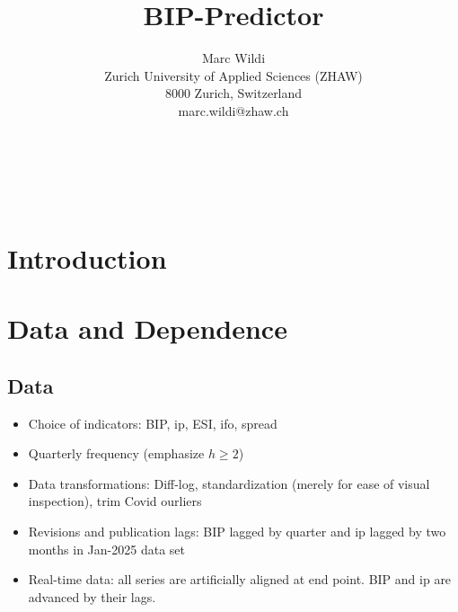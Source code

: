 \documentclass[a4paper]{article}
\title{BIP-Predictor}
\author{Marc Wildi\\
Zurich University of Applied Sciences (ZHAW)\\
8000 Zurich, Switzerland\\
marc.wildi@zhaw.ch}
\begin{document}
\maketitle

\begin{abstract}
\noindent 

\end{abstract}

~\\
~\\





\section{Introduction}



\section{Data and Dependence}




\subsection{Data}

\begin{itemize}
\item Choice of indicators: BIP, ip, ESI, ifo, spread
\item Quarterly frequency (emphasize $h\geq 2$)
\item Data transformations: Diff-log, standardization (merely for ease of visual inspection), trim Covid ourliers
\item Revisions and publication lags:  BIP lagged by quarter and ip lagged by two months in Jan-2025 data set
\item Real-time data: all series are artificially aligned at end point. BIP and ip are advanced by their lags.
\end{itemize}
\end{document}
